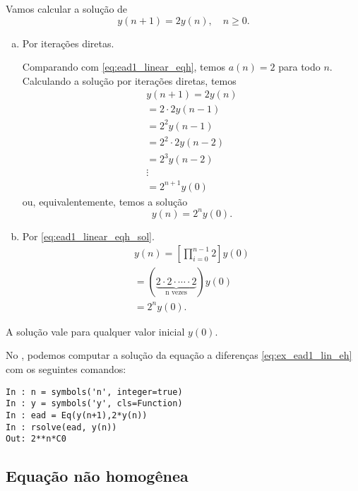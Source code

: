 \begin{ex}
  Vamos calcular a solução de
  \begin{equation}\label{eq:ex_ead1_lin_eh}
    y(n+1) = 2y(n),\quad n\geq 0.
  \end{equation}

  \begin{enumerate}[a)]
  \item Por iterações diretas.

    Comparando com \eqref{eq:ead1_linear_eqh}, temos $a(n) = 2$ para todo $n$. Calculando a solução por iterações diretas, temos
  \begin{gather}
    y(n+1) = 2y(n) \\
           = 2\cdot 2y(n-1) \\
           = 2^2y(n-1) \\
           = 2^2\cdot 2y(n-2) \\
           = 2^3y(n-2) \\
           \vdots \nonumber\\
           = 2^{n+1}y(0)
  \end{gather}
  ou, equivalentemente, temos a solução
  \begin{equation}
    y(n) = 2^ny(0).
  \end{equation}

\item Por \ref {eq:ead1_linear_eqh_sol}.
  \begin{gather}
    y(n) = \left[\prod_{i=0}^{n-1}2\right]y(0) \\
    = (\underbrace{2\cdot 2\cdot \cdots \cdot 2}_{\text{n vezes}}) y(0)\\
    = 2^{n}y(0).
  \end{gather}
\end{enumerate}
  A solução vale para qualquer valor inicial $y(0)$.

  \ifispython
  No \python, podemos computar a solução da equação a diferenças \eqref{eq:ex_ead1_lin_eh} com os seguintes comandos:
\begin{verbatim}
In : n = symbols('n', integer=true)
In : y = symbols('y', cls=Function)
In : ead = Eq(y(n+1),2*y(n))
In : rsolve(ead, y(n))
Out: 2**n*C0
\end{verbatim}
  \fi
\end{ex}

\subsection{Equação não homogênea}

